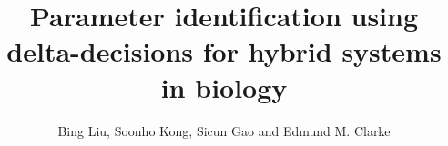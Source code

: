\documentclass{bioinfo}
\begin{document}



\title[Parameter identification for biological hybrid systems]{Parameter identification using delta-decisions for hybrid systems in biology}
\author[Liu \textit{et~al}]{Bing Liu, Soonho Kong, Sicun Gao and Edmund M. Clarke} %
\address{Computer Science Department, Carnegie Mellon University, PA 15213, USA}




\maketitle











\end{document}
